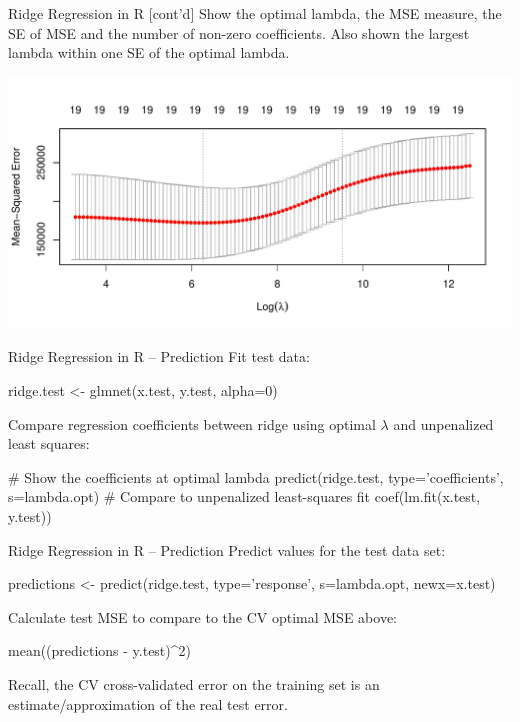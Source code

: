 \documentclass[ignorenonframetext,xcolor=x11names]{beamer}
\begin{document}
\begin{frame}[fragile]{Ridge Regression in R \small [cont'd]}
\small
Show the optimal lambda, the MSE measure, the SE of MSE and the number of non-zero coefficients. Also shown the largest lambda within one SE of the optimal lambda.
\includegraphics[width=\textwidth]{crossvalidated_ridge.pdf}
\end{frame}

\begin{frame}[fragile]{Ridge Regression in R -- Prediction}
\small
Fit test data:
\begin{Rcode}
ridge.test <- glmnet(x.test, y.test, alpha=0)
\end{Rcode}
Compare regression coefficients between ridge using optimal $\lambda$ and unpenalized least squares:
\begin{Rcode}
# Show the coefficients at optimal lambda
predict(ridge.test, type='coefficients', s=lambda.opt)
# Compare to unpenalized least-squares fit
coef(lm.fit(x.test, y.test))
\end{Rcode}
\end{frame}


\begin{frame}[fragile]{Ridge Regression in R -- Prediction}
\small
Predict values for the test data set:
\begin{Rcode}
predictions <- predict(ridge.test, type='response', 
                       s=lambda.opt, newx=x.test)
\end{Rcode}
Calculate test MSE to compare to the CV optimal MSE above:
\begin{Rcode}
mean((predictions - y.test)^2)
\end{Rcode}
Recall, the CV cross-validated error on the training set is an estimate/approximation of the real test error.
\end{frame}
\end{document}
